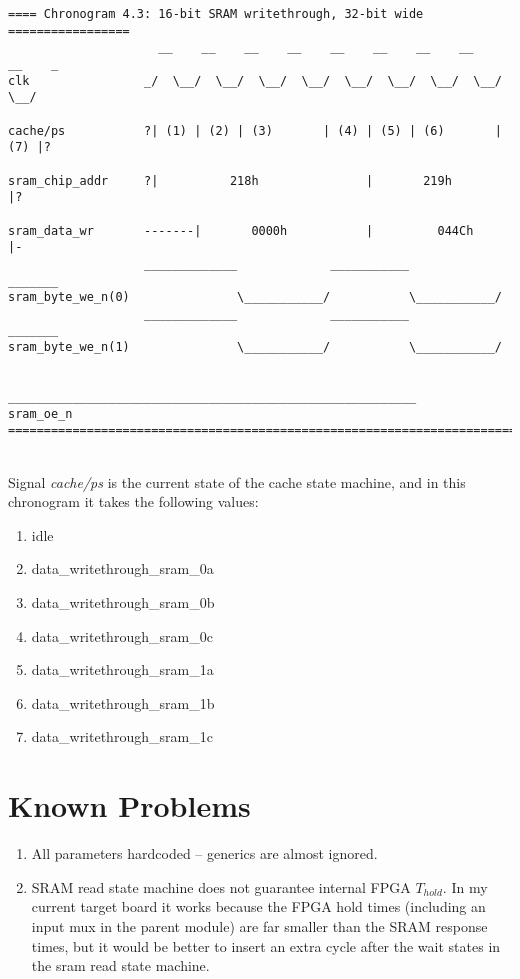 \begin{verbatim}
==== Chronogram 4.3: 16-bit SRAM writethrough, 32-bit wide =================
                     __    __    __    __    __    __    __    __    __    _
clk                _/  \__/  \__/  \__/  \__/  \__/  \__/  \__/  \__/  \__/ 

cache/ps           ?| (1) | (2) | (3)       | (4) | (5) | (6)       | (7) |?

sram_chip_addr     ?|          218h               |       219h            |?

sram_data_wr       -------|       0000h           |         044Ch         |-
                   _____________             ___________             _______
sram_byte_we_n(0)               \___________/           \___________/
                   _____________             ___________             _______
sram_byte_we_n(1)               \___________/           \___________/

                   _________________________________________________________
sram_oe_n          
============================================================================
\end{verbatim}\\

Signal \emph{cache/ps} is the current state of the cache state machine, and
in this chronogram it takes the following values:

\begin{enumerate}
\item idle
\item data\_writethrough\_sram\_0a
\item data\_writethrough\_sram\_0b
\item data\_writethrough\_sram\_0c
\item data\_writethrough\_sram\_1a
\item data\_writethrough\_sram\_1b
\item data\_writethrough\_sram\_1c
\end{enumerate}

   

\section{Known Problems}
\label{cache_problems}

\begin{enumerate}
\item All parameters hardcoded -- generics are almost ignored.
\item SRAM read state machine does not guarantee internal FPGA $T_{hold}$. 
        In my current target board it works because the FPGA hold times 
        (including an input mux
        in the parent module) are far smaller than the SRAM response times, but
        it would be better to insert an extra cycle after the wait states in
        the sram read state machine.
\end{enumerate}

